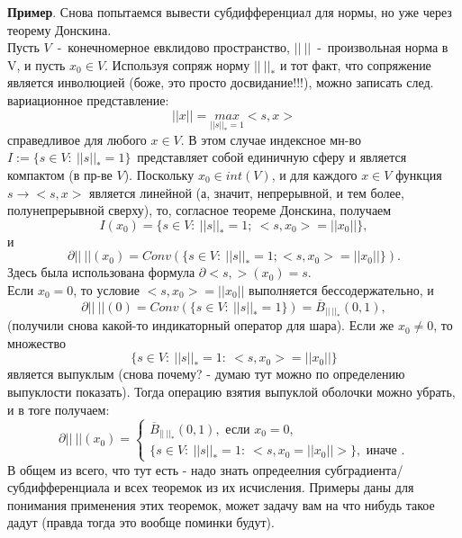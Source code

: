 \textbf{Пример}. Снова попытаемся вывести субдифференциал для нормы, но уже через теорему Донскина.\\
Пусть $V$~-~конечномерное евклидово пространство, $||~||$~-~произвольная норма в V, и пусть $x_0 \in V$. Используя сопряж норму $||~||_{*}$ и тот факт, что сопряжение является инволюцией (боже, это просто досвидание!!!), можно записать след. вариационное представление:
$$
||x|| = \underset{||s||_{*}=1}{max}<s,x>
$$
справедливое для любого $x \in V$. В этом случае индексное мн-во $I := \{s \in V:~||s||_{*}=1\}$~представляет собой единичную сферу и является компактом (в пр-ве $V$). Поскольку $x_0 \in int(V)$, и для каждого $x \in V$ функция $s \to <s,x>$ является линейной (а, значит, непрерывной, и тем более, полунепрерывной сверху), то, согласное теореме Донскина, получаем
$$
I(x_0)=\{s \in V:~||s||_{*}=1;~<s,x_0>=||x_0||\},
$$
и
$$
\partial||~||(x_0)=Conv(\{s \in V:~||s||_{*}=1; <s,x_0>=||x_0||\}).
$$
Здесь была использована формула $\partial<s,>(x_0)={s}$.\\
Если $x_0=0$, то условие $<s,x_0>=||x_0||$ выполняется бессодержательно, и
$$
\partial||~||(0)=Conv(\{s \in V:~||s||_{*}=1\})=\overline{B}_{||~||_{*}}(0,1),
$$
(получили снова какой-то индикаторный оператор для шара). Если же $x_0 \neq 0$, то множество
$$
\{s \in V:~||s||_{*}=1:~<s,x_0>=||x_0||\}
$$
является выпуклым (снова почему? - думаю тут можно по определению выпуклости показать). Тогда операцию взятия выпуклой оболочки можно убрать, и в тоге получаем:
$$
\partial||~||(x_0)=\begin{cases}
                   \overline{B}_{||~||_{*}}(0,1),\text{~если~}x_0=0,\\
                   \{s \in V:~||s||_{*}=1:~<s,x_0=||x_0||>\},\text{~иначе~}.
\end{cases}
$$
В общем из всего, что тут есть - надо знать опредеелния субградиента/субдифференциала и всех теоремок из их исчисления. Примеры даны для понимания применения этих теоремок, может задачу вам на что нибудь такое дадут (правда тогда это вообще поминки будут).